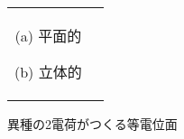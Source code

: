                 \begin{figure}[hbt]
                    \begin{tabular}{cc}
                        \begin{minipage}{0.5\hsize}
                                \begin{center}
                                    {toudenimen.pdf}
                                    \label{fig:toudenimen2}

                                    (a) 平面的
                                \end{center}
                        \end{minipage}
                        \begin{minipage}{0.5\hsize}
                                \begin{center}
                                    {Potentiol_dipole.pdf}
                                    \label{fig:toudenimen3}

                                    (b) 立体的
                                \end{center}
                        \end{minipage}
                    \end{tabular}
                    \caption{異種の2電荷がつくる等電位面}
                \end{figure}


